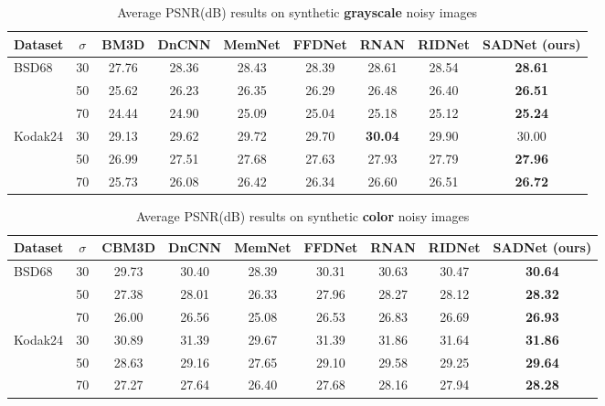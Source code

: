 \documentclass[runningheads]{llncs}
\begin{document}
\begin{table*}
\setlength{\tabcolsep}{2pt}
\begin{center}
\caption{Average PSNR(dB) results on synthetic \textbf{grayscale} noisy images}
\label{table_gray}
\begin{tabular}{lcccccccc}
\hline
Dataset & $\sigma$ & BM3D & DnCNN & MemNet & FFDNet & RNAN & RIDNet & SADNet (ours) \\
\hline\hline
\multirow{2}{*}{BSD68} & 30 & 27.76 & 28.36 & 28.43 & 28.39 & 28.61 & 28.54 & \textbf{28.61}\\
~ & 50 & 25.62 & 26.23 & 26.35 & 26.29 & 26.48 & 26.40 & \textbf{26.51}\\
~ & 70 & 24.44 & 24.90 & 25.09 & 25.04 & 25.18 & 25.12 & \textbf{25.24}\\
\hline
\multirow{2}{*}{Kodak24} & 30 & 29.13 & 29.62 & 29.72 & 29.70 & \textbf{30.04} & 29.90 & 30.00\\
~ & 50 & 26.99 & 27.51 & 27.68 & 27.63 & 27.93 & 27.79 & \textbf{27.96}\\
~ & 70 & 25.73 & 26.08 & 26.42 & 26.34 & 26.60 & 26.51 & \textbf{26.72}\\
\hline
\end{tabular}
\end{center}
\end{table*}

\begin{table*}
\setlength{\tabcolsep}{2pt}
\begin{center}
\caption{Average PSNR(dB) results on synthetic \textbf{color} noisy images}
\label{table_color}
\begin{tabular}{lcccccccc}
\hline
Dataset & $\sigma$ & CBM3D & DnCNN & MemNet & FFDNet & RNAN & RIDNet & SADNet (ours) \\
\hline\hline
\multirow{2}{*}{BSD68} & 30 & 29.73 & 30.40 & 28.39 & 30.31 & 30.63 & 30.47 & \textbf{30.64}\\
~ & 50 & 27.38 & 28.01 & 26.33 & 27.96 & 28.27 & 28.12 & \textbf{28.32}\\
~ & 70 & 26.00 & 26.56 & 25.08 & 26.53 & 26.83 & 26.69 & \textbf{26.93}\\
\hline
\multirow{2}{*}{Kodak24} & 30 & 30.89 & 31.39 & 29.67 & 31.39 & 31.86 & 31.64 & \textbf{31.86}\\
~ & 50 & 28.63 & 29.16 & 27.65 & 29.10 & 29.58 & 29.25 & \textbf{29.64}\\
~ & 70 & 27.27 & 27.64 & 26.40 & 27.68 & 28.16 & 27.94 & \textbf{28.28}\\
\hline
\end{tabular}
\end{center}
\end{table*}
\end{document}
